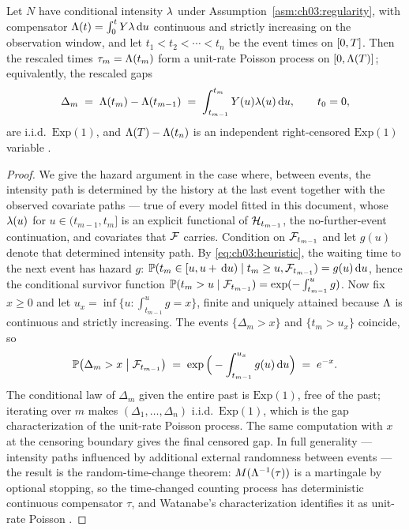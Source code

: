 \begin{theorem}\label{thm:ch03:rescaling}
Let $N$ have conditional intensity $\lambda$ under
Assumption~\ref{asm:ch03:regularity}, with compensator
$\Lambda(t) = \int_0^t Y\lambda\,\mathrm{d} u$ continuous and strictly increasing
on the observation window, and let $t_1 < t_2 < \cdots < t_n$ be the event
times on $[0,T]$. Then the rescaled times $\tau_m = \Lambda(t_m)$ form a
unit-rate Poisson process on $[0, \Lambda(T)]$; equivalently, the
rescaled gaps
\begin{equation}\label{eq:ch03:rescaled}
\Delta_m \;=\; \Lambda(t_m) - \Lambda(t_{m-1})
 \;=\; \int_{t_{m-1}}^{t_m} Y(u)\lambda(u)\,\mathrm{d} u,
\qquad t_0 = 0,
\end{equation}
are i.i.d.\ $\mathrm{Exp}(1)$, and $\Lambda(T) - \Lambda(t_n)$ is an
independent right-censored $\mathrm{Exp}(1)$ variable
\citep{brown2002,ogata1988}.
\end{theorem}

\begin{proof}
We give the hazard argument in the case where, between events, the
intensity path is determined by the history at the last event together
with the observed covariate paths --- true of every model fitted in this
document, whose $\lambda(u)$ for $u \in (t_{m-1}, t_m]$ is an explicit
functional of $\mathcal{H}_{t_{m-1}}$, the no-further-event continuation, and
covariates that $\mathcal{F}$ carries. Condition on $\mathcal{F}_{t_{m-1}}$ and let $g(u)$
denote that determined intensity path. By \cref{eq:ch03:heuristic}, the
waiting time to the next event has hazard $g$:
$\mathbb{P}(t_m \in [u, u+\,\mathrm{d} u) \mid t_m \ge u, \mathcal{F}_{t_{m-1}}) = g(u)\,\mathrm{d} u$,
hence the conditional survivor function
$\mathbb{P}(t_m > u \mid \mathcal{F}_{t_{m-1}}) = \exp(-\int_{t_{m-1}}^{u} g)$. Now fix
$x \ge 0$ and let $u_x = \inf\{u : \int_{t_{m-1}}^{u} g = x\}$, finite and
uniquely attained because $\Lambda$ is continuous and strictly increasing.
The events $\{\Delta_m > x\}$ and $\{t_m > u_x\}$ coincide, so
\[
\mathbb{P}\big(\Delta_m > x \;\big|\; \mathcal{F}_{t_{m-1}}\big)
 \;=\;
 \exp\Big(-\int_{t_{m-1}}^{u_x} g(u)\,\mathrm{d} u\Big)
 \;=\; e^{-x}.
\]
The conditional law of $\Delta_m$ given the entire past is $\mathrm{Exp}(1)$,
free of the past; iterating over $m$ makes $(\Delta_1,\dots,\Delta_n)$
i.i.d.\ $\mathrm{Exp}(1)$, which is the gap characterization of the
unit-rate Poisson process. The same computation with $x$ at the censoring
boundary gives the final censored gap. In full generality --- intensity
paths influenced by additional external randomness between events --- the
result is the random-time-change theorem: $M(\Lambda^{-1}(\tau))$ is a
martingale by optional stopping, so the time-changed counting process has
deterministic continuous compensator $\tau$, and Watanabe's
characterization identifies it as unit-rate Poisson \citep{daley2008}.
\end{proof}

